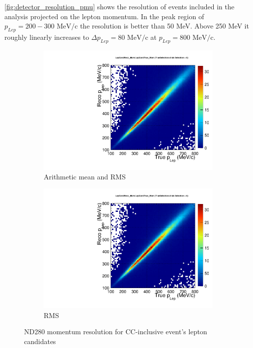 \autoref{fig:detector_resolution_pmu} shows the resolution of events included in the analysis projected on the lepton momentum. In the peak region of $p_{Lep} = 200-300 \text{ MeV/c}$ the resolution is better than 50 MeV. Above 250 MeV it roughly linearly increases to $\Delta p_{Lep} = 80 \text{ MeV/c}$ at $p_{Lep} = 800 \text{ MeV/c}$.
\begin{figure}[h]
	\begin{subfigure}[t]{0.49\textwidth}
		\includegraphics[width=\textwidth, trim={0mm 0mm 17mm 0mm}, clip,page=2]{figures/det/resolution/LepCandTrue_And_Reco_Pmu_ForJacob}
		\caption{Arithmetic mean and RMS}
	\end{subfigure}
	\begin{subfigure}[t]{0.49\textwidth}
	\includegraphics[width=\textwidth, trim={0mm 0mm 17mm 0mm}, clip,page=4]{figures/det/resolution/LepCandTrue_And_Reco_Pmu_ForJacob}
	\caption{RMS}
	\end{subfigure}
	\caption{ND280 momentum resolution for CC-inclusive event's lepton candidates}
	\label{fig:detector_resolution_pmu}
\end{figure}

